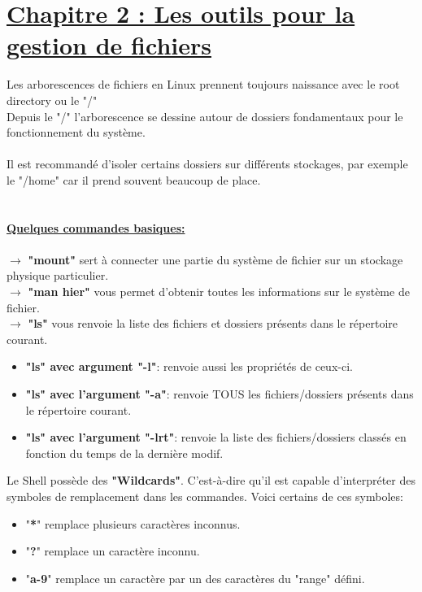 \documentclass[12pt, a4paper]{article}
\begin{document}
\section*{\underline{Chapitre 2 : Les outils pour la gestion de fichiers}}
Les arborescences de fichiers en Linux prennent toujours naissance avec le root directory ou le "/"\\
Depuis le "/" l'arborescence se dessine autour de dossiers fondamentaux pour le fonctionnement du système.\\
\\
Il est recommandé d'isoler certains dossiers sur différents stockages, par exemple le "/home" car il prend souvent beaucoup de place.\\
\\
\\
\underline{\textbf{Quelques commandes basiques:}}\\
\\ 
$\rightarrow$ \textbf{"mount"} sert à connecter une partie du système de fichier sur un stockage physique particulier.\\
$\rightarrow$ \textbf{"man hier"} vous permet d'obtenir toutes les informations sur le système de fichier.\\
$\rightarrow$ \textbf{"ls"} vous renvoie la liste des fichiers et dossiers présents dans le répertoire courant.
\begin{itemize}
  \setlength\itemsep{-0.4em}
\item \textbf{"ls" avec argument "-l"}: renvoie aussi les propriétés de ceux-ci.
\item \textbf{"ls" avec l'argument "-a"}: renvoie TOUS les fichiers/dossiers présents dans le répertoire courant.
\item \textbf{"ls" avec l'argument "-lrt"}: renvoie la liste des fichiers/dossiers classés en fonction du temps de la dernière modif.\\ 
\end{itemize}
Le Shell possède des \textbf{"Wildcards"}. C'est-à-dire qu'il est capable d'interpréter des symboles de remplacement dans les commandes. Voici certains de ces symboles:
\begin{itemize}
\setlength\itemsep{-0.4em}
\item "\textbf{*}" remplace plusieurs caractères inconnus.
\item "\textbf{?}" remplace un caractère inconnu.
\item "\textbf{a-9}" remplace un caractère par un des caractères du "range" défini.\\ 
\end{itemize}
\end{document}
